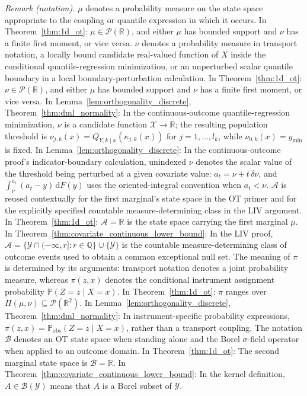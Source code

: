 \noindent\textit{Remark (notation).} $\mu$ denotes a probability measure on the state space appropriate to the coupling or quantile expression in which it occurs. In Theorem~\ref{thm:1d_ot}: $\mu\in\mathcal P(\mathbb R)$, and either $\mu$ has bounded support and $\nu$ has a finite first moment, or vice versa. $\nu$ denotes a probability measure in transport notation, a locally bound candidate real-valued function of $X$ inside the conditional quantile-regression minimization, or an unperturbed scalar quantile boundary in a local boundary-perturbation calculation. In Theorem~\ref{thm:1d_ot}: $\nu\in\mathcal P(\mathbb R)$, and either $\mu$ has bounded support and $\nu$ has a finite first moment, or vice versa. In Lemma~\ref{lem:orthogonality_discrete}, Theorem~\ref{thm:dml_normality}: In the continuous-outcome quantile-regression minimization, $\nu$ is a candidate function $\mathcal X\to\mathbb R$; the resulting population threshold is $\nu_{j,k}(x)=Q_{Y,k\mid x}(\kappa_{j,k}(x))$ for $j=1,\ldots,l_k$, while $\nu_{0,k}(x)=y_{\min}$ is fixed. In Lemma~\ref{lem:orthogonality_discrete}: In the continuous-outcome proof's indicator-boundary calculation, unindexed $\nu$ denotes the scalar value of the threshold being perturbed at a given covariate value: $a_t=\nu+t\,\delta\nu$, and $\int_{\nu}^{a_t}(a_t-y)\,\mathrm{d}F(y)$ uses the oriented-integral convention when $a_t<\nu$. $\mathcal A$ is reused contextually for the first marginal's state space in the OT primer and for the explicitly specified countable measure-determining class in the LIV argument. In Theorem~\ref{thm:1d_ot}: $\mathcal A=\mathbb R$ is the state space carrying the first marginal $\mu$. In Theorem~\ref{thm:covariate_continuous_lower_bound}: In the LIV proof, $\mathcal A=\{\mathcal Y\cap(-\infty,r]:r\in\mathbb Q\}\cup\{\mathcal Y\}$ is the countable measure-determining class of outcome events used to obtain a common exceptional null set. The meaning of $\pi$ is determined by its arguments: transport notation denotes a joint probability measure, whereas $\pi(z,x)$ denotes the conditional instrument assignment probability $\mathbb P(Z=z\mid X=x)$. In Theorem~\ref{thm:1d_ot}: $\pi$ ranges over $\Pi(\mu,\nu)\subseteq\mathcal P(\mathbb R^2)$. In Lemma~\ref{lem:orthogonality_discrete}, Theorem~\ref{thm:dml_normality}: In instrument-specific probability expressions, $\pi(z,x)=\mathbb P_{\mathrm{obs}}(Z=z\mid X=x)$, rather than a transport coupling. The notation $\mathcal B$ denotes an OT state space when standing alone and the Borel $\sigma$-field operator when applied to an outcome domain. In Theorem~\ref{thm:1d_ot}: The second marginal state space is $\mathcal B=\mathbb R$. In Theorem~\ref{thm:covariate_continuous_lower_bound}: In the kernel definition, $A\in\mathcal B(\mathcal Y)$ means that $A$ is a Borel subset of $\mathcal Y$.


